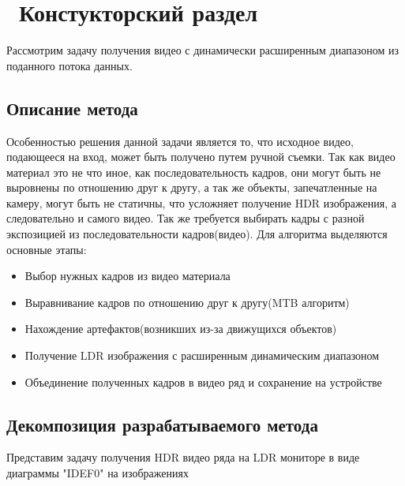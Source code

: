 \chapter{ Констукторский раздел}
\label{cha:design}

Рассмотрим задачу получения видео с динамически расширенным диапазоном из поданного потока данных. 

\section{ Описание метода}

    Особенностью решения данной задачи является то, что исходное видео, подающееся на вход, может быть получено путем ручной съемки. Так как видео материал это не что иное, как последовательность кадров, они могут быть не выровнены по отношению друг к другу, а так же объекты, запечатленные на камеру, могут быть не статичны, что усложняет получение HDR изображения, а следовательно и самого видео. Так же требуется выбирать кадры с разной экспозицией из последовательности кадров(видео). Для алгоритма выделяются основные этапы:

\begin{itemize}
    \item Выбор нужных кадров из видео материала
    \item Выравнивание кадров по отношению друг к другу(MTB алгоритм)
    \item Нахождение артефактов(возникших из-за движущихся объектов)
    \item Получение LDR изображения с расширенным динамическим диапазоном
    \item Объединение полученных кадров в видео ряд и сохранение на устройстве
\end{itemize}

\section{ Декомпозиция разрабатываемого метода}

Представим задачу получения HDR видео ряда на LDR мониторе в виде диаграммы "IDEF0" на изображениях
